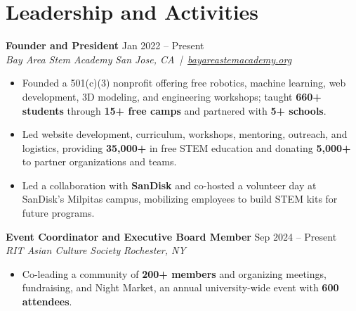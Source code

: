 \documentclass[10pt,letterpaper]{article}
\newif\ifresumeFirstRole
\newcommand{\resumeRole}[4]{%
  \ifresumeFirstRole
    \global\resumeFirstRolefalse
  \else
    \vspace{0pt plus 1fill}%
  \fi
  \textbf{#1} \hfill #2\\
  \textit{#3} \hfill \textit{#4}
}
\begin{document}
\section*{Leadership and Activities}
\resumeRole{Founder and President}{Jan 2022 -- Present}{Bay Area Stem Academy}{San Jose, CA \,|\, \href{https://bayareastemacademy.org}{bayareastemacademy.org}}
\begin{itemize}
  \item Founded a 501(c)(3) nonprofit offering free robotics, machine learning, web development, 3D modeling, and engineering workshops; taught \textbf{660+ students} through \textbf{15+ free camps} and partnered with \textbf{5+ schools}.
  \item Led website development, curriculum, workshops, mentoring, outreach, and logistics, providing \textbf{\textdollar{}35,000+} in free STEM education and donating \textbf{\textdollar{}5,000+} to partner organizations and teams.
  \item Led a collaboration with \textbf{SanDisk} and co-hosted a volunteer day at SanDisk's Milpitas campus, mobilizing employees to build STEM kits for future programs.
\end{itemize}

\resumeRole{Event Coordinator and Executive Board Member}{Sep 2024 -- Present}{RIT Asian Culture Society}{Rochester, NY}
\begin{itemize}
  \item Co-leading a community of \textbf{200+ members} and organizing meetings, fundraising, and Night Market, an annual university-wide event with \textbf{600 attendees}.
\end{itemize}
\end{document}
